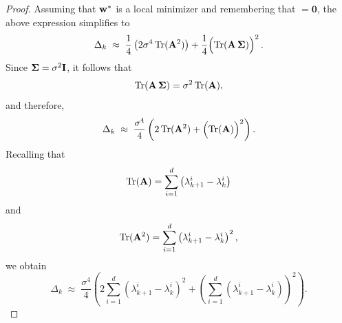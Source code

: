 \documentclass{article}
\begin{document}
\begin{proof}
  Assuming that $\mathbf{w}^*$ is a local minimizer and remembering that $\bm = \mathbf{0}$, the above expression simplifies to
  $$\Delta_k \;\approx\; \frac{1}{4}\left( 2 \sigma^4\,\mathrm{Tr}(\mathbf{A}^2) \right) + \frac{1}{4}\Bigl( \mathrm{Tr}(\mathbf{A}\,\boldsymbol{\Sigma}) \Bigr)^2\,.$$
  Since $\boldsymbol{\Sigma} = \sigma^2 \mathbf{I}$, it follows that
  $$\mathrm{Tr}(\mathbf{A}\,\boldsymbol{\Sigma}) = \sigma^2\,\mathrm{Tr}(\mathbf{A}),$$
  and therefore,
  $$\Delta_k \;\approx\; \frac{\sigma^4}{4} \left( 2\,\mathrm{Tr}(\mathbf{A}^2) + \Bigl(\mathrm{Tr}(\mathbf{A})\Bigr)^2 \right).$$
  Recalling that $$\mathrm{Tr}(\mathbf{A}) = \sum\limits_{i=1}^{d}\left( \lambda_{k+1}^i - \lambda_{k}^i \right)$$ and
  $$\mathrm{Tr}(\mathbf{A}^2) = \sum_{i=1}^{d}\left( \lambda_{k+1}^i - \lambda_{k}^i \right)^2,$$
  we obtain
  $$\Delta_k \;\approx\; \frac{\sigma^4}{4} \left( 2 \sum_{i=1}^{d}\left( \lambda_{k+1}^i - \lambda_{k}^i \right)^2 + \left(
      \sum_{i=1}^{d}\left( \lambda_{k+1}^i - \lambda_{k}^i \right) \right)^2 \right).$$
\end{proof}
\end{document}

